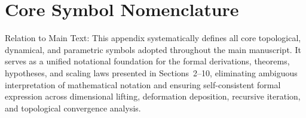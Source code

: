\documentclass[conference]{IEEEtran}
\theoremstyle{remark}
\begin{document}



\appendices

\section{Core Symbol Nomenclature}
\label{app:A}

Relation to Main Text: This appendix systematically defines all core topological, dynamical, and parametric symbols adopted throughout the main manuscript. It serves as a unified notational foundation for the formal derivations, theorems, hypotheses, and scaling laws presented in Sections~2--10, eliminating ambiguous interpretation of mathematical notation and ensuring self-consistent formal expression across dimensional lifting, deformation deposition, recursive iteration, and topological convergence analysis.
\end{document}

